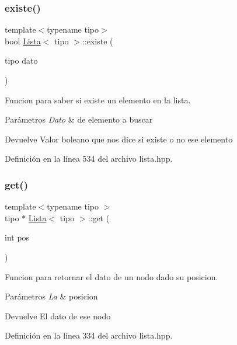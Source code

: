 \subsubsection{\texorpdfstring{existe()}{existe()}}
{\footnotesize\ttfamily template$<$typename tipo$>$ \\
bool \hyperlink{classLista}{Lista}$<$ tipo $>$\+::existe (\begin{DoxyParamCaption}\item[{tipo}]{dato }\end{DoxyParamCaption})}



Funcion para saber si existe un elemento en la lista. 


\begin{DoxyParams}{Parámetros}
{\em Dato} & de elemento a buscar \\
\hline
\end{DoxyParams}
\begin{DoxyReturn}{Devuelve}
Valor boleano que nos dice si existe o no ese elemento 
\end{DoxyReturn}


Definición en la línea 534 del archivo lista.\+hpp.

\mbox{\label{classLista_ada89d0bebdb2db83b7c19c940ab70e62}} 
\subsubsection{\texorpdfstring{get()}{get()}}
{\footnotesize\ttfamily template$<$typename tipo $>$ \\
tipo $\ast$ \hyperlink{classLista}{Lista}$<$ tipo $>$\+::get (\begin{DoxyParamCaption}\item[{int}]{pos }\end{DoxyParamCaption})}



Funcion para retornar el dato de un nodo dado su posicion. 


\begin{DoxyParams}{Parámetros}
{\em La} & posicion \\
\hline
\end{DoxyParams}
\begin{DoxyReturn}{Devuelve}
El dato de ese nodo 
\end{DoxyReturn}


Definición en la línea 334 del archivo lista.\+hpp.

